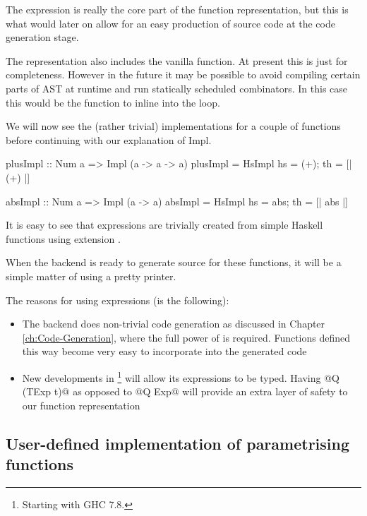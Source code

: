 \documentclass[preamble.tex]{subfiles}
\begin{document}
The  expression is really the core part of the function representation, but this is what would later on allow for an easy production of \Haskell source code at the code generation stage.

The representation also includes the vanilla \Haskell function. At present this is just for completeness. However in the future it may be possible to avoid compiling certain parts of AST at runtime and run statically scheduled combinators. In this case this would be the function to inline into the loop.

We will now see the (rather trivial) implementations for a couple of functions before continuing with our explanation of Impl.

\begin{hscode}
plusImpl :: Num a => Impl (a -> a -> a)
plusImpl = HsImpl { hs = (+); th = [| (+) |] } 

absImpl :: Num a => Impl (a -> a)
absImpl = HsImpl { hs = abs; th = [| abs |] } 
\end{hscode}

It is easy to see that  expressions are trivially created from simple Haskell functions using  extension \cite{QQ}.

When the backend is ready to generate \Haskell source for these functions, it will be a simple matter of using a  pretty printer. 

The reasons for using  expressions (is the following):
\begin{itemize}
\item The backend does non-trivial code generation as discussed in Chapter \ref{ch:Code-Generation}, where the full power of  is required. Functions defined this way become very easy to incorporate into the generated code
\item New developments in \footnote{Starting with GHC 7.8.} will allow its expressions to be typed. Having @Q (TExp t)@ as opposed to @Q Exp@ will provide an extra layer of safety to our function representation
\end{itemize}


\subsection{User-defined implementation of parametrising functions}
\end{document}

